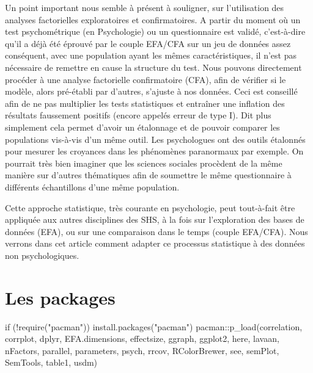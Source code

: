 \documentclass[
  french,
  11pt,
  a4paper,
]{article}
\newenvironment{Shaded}{}{}
\newcommand{\ControlFlowTok}[1]{\textcolor[rgb]{0.84,0.23,0.29}{#1}}
\newcommand{\FunctionTok}[1]{\textcolor[rgb]{0.44,0.26,0.76}{#1}}
\newcommand{\NormalTok}[1]{\textcolor[rgb]{0.14,0.16,0.18}{#1}}
\newcommand{\SpecialCharTok}[1]{\textcolor[rgb]{0.00,0.36,0.77}{#1}}
\newcommand{\StringTok}[1]{\textcolor[rgb]{0.01,0.18,0.38}{#1}}
\begin{document}
Un point important nous semble à présent à souligner, sur l'utilisation
des analyses factorielles exploratoires et confirmatoires. A partir du
moment où un test psychométrique (en Psychologie) ou un questionnaire
est validé, c'est-à-dire qu'il a déjà été éprouvé par le couple EFA/CFA
sur un jeu de données assez conséquent, avec une population ayant les
mêmes caractéristiques, il n'est pas nécessaire de remettre en cause la
structure du test. Nous pouvons directement procéder à une analyse
factorielle confirmatoire (CFA), afin de vérifier si le modèle, alors
pré-établi par d'autres, s'ajuste à nos données. Ceci est conseillé afin
de ne pas multiplier les tests statistiques et entraîner une inflation
des résultats faussement positifs (encore appelés erreur de type I). Dit
plus simplement cela permet d'avoir un étalonnage et de pouvoir comparer
les populations vis-à-vis d'un même outil. Les psychologues ont des
outils étalonnés pour mesurer les croyances dans les phénomènes
paranormaux par exemple. On pourrait très bien imaginer que les sciences
sociales procèdent de la même manière sur d'autres thématiques afin de
soumettre le même questionnaire à différents échantillons d'une même
population.

Cette approche statistique, très courante en psychologie, peut
tout-à-fait être appliquée aux autres disciplines des SHS, à la fois sur
l'exploration des bases de données (EFA), ou sur une comparaison dans le
temps (couple EFA/CFA). Nous verrons dans cet article comment adapter ce
processus statistique à des données non psychologiques.

\section{Les packages}\label{les-packages}

\begin{Shaded}
\begin{Highlighting}[]
\ControlFlowTok{if}\NormalTok{ (}\SpecialCharTok{!}\FunctionTok{require}\NormalTok{(}\StringTok{"pacman"}\NormalTok{)) }\FunctionTok{install.packages}\NormalTok{(}\StringTok{"pacman"}\NormalTok{)}
\NormalTok{pacman}\SpecialCharTok{::}\FunctionTok{p\_load}\NormalTok{(correlation, corrplot, dplyr, EFA.dimensions, effectsize, ggraph, ggplot2, here, lavaan, nFactors, parallel, parameters, psych, rrcov, RColorBrewer, see, semPlot, SemTools, table1, usdm)}
\end{Highlighting}
\end{Shaded}
\end{document}
